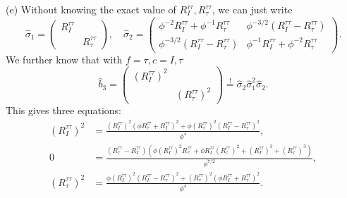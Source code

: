 (e) Without knowing the exact value of $R_{I}^{\tau \tau } ,R_{\tau }^{\tau \tau }$, we can just write
\begin{equation*}
\hat{\sigma }_{1} =\begin{pmatrix}
R_{I}^{\tau \tau } & \\
 & R_{\tau }^{\tau \tau }
\end{pmatrix} ,\quad \hat{\sigma }_{2} =\begin{pmatrix}
\phi ^{-2} R_{I}^{\tau \tau } +\phi ^{-1} R_{\tau }^{\tau \tau } & \phi ^{-3/2} (R_{I}^{\tau \tau } -R_{\tau }^{\tau \tau } )\\
\phi ^{-3/2} (R_{I}^{\tau \tau } -R_{\tau }^{\tau \tau } ) & \phi ^{-1} R_{I}^{\tau \tau } +\phi ^{-2} R_{\tau }^{\tau \tau }
\end{pmatrix} .
\end{equation*}
We further know that with $f=\tau ,c=I,\tau $
\begin{equation*}
\hat{b}_{3} =\begin{pmatrix}
(R_{I}^{\tau \tau } )^{2} & \\
 & (R_{\tau }^{\tau \tau } )^{2}
\end{pmatrix}\stackrel{!}{=}\hat{\sigma }_{2}\hat{\sigma }_{1}^{2}\hat{\sigma }_{2} .
\end{equation*}
This gives three equations:
\begin{equation*}
\begin{aligned}
(R_{I}^{\tau \tau } )^{2} & =\frac{(R_{I}^{\tau \tau } )^{2} (\phi R_{\tau }^{\tau \tau } +R_{I}^{\tau \tau } )^{2} +\phi (R_{\tau }^{\tau \tau } )^{2} (R_{I}^{\tau \tau } -R_{\tau }^{\tau \tau } )^{2}}{\phi ^{4}} ,\\
0 & =\frac{(R_{\tau }^{\tau \tau } -R_{I}^{\tau \tau } )(\phi (R_{I}^{\tau \tau } )^{2} R_{\tau }^{\tau \tau } +\phi R_{I}^{\tau \tau } (R_{\tau }^{\tau \tau } )^{2} +(R_{I}^{\tau \tau } )^{3} +(R_{\tau }^{\tau \tau } )^{3} )}{\phi ^{7/2}} ,\\
(R_{\tau }^{\tau \tau } )^{2} & =\frac{\phi (R_{I}^{\tau \tau } )^{2} (R_{I}^{\tau \tau } -R_{\tau }^{\tau \tau } )^{2} +(R_{\tau }^{\tau \tau } )^{2} (\phi R_{I}^{\tau \tau } +R_{\tau }^{\tau \tau } )^{2}}{\phi ^{4}} .
\end{aligned}
\end{equation*}


